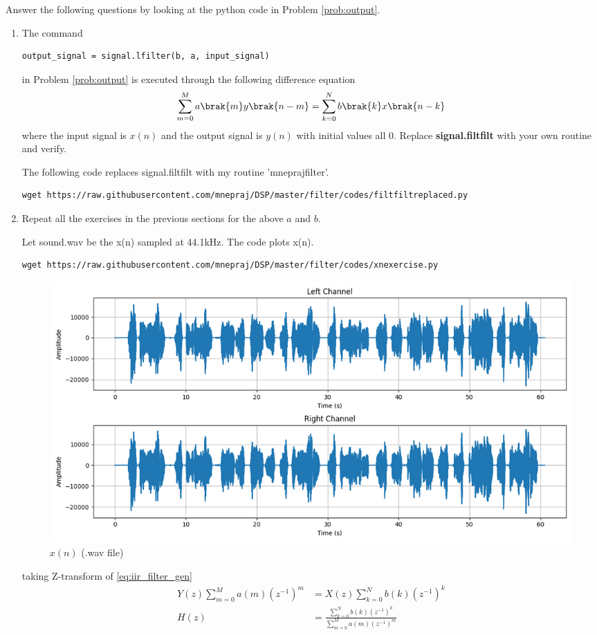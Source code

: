 \documentclass[journal, 12pt, twocolumn]{IEEEtran}
\renewcommand\thesection{\arabic{section}}
\begin{document}
Answer the following questions by looking at the python code in Problem \ref{prob:output}.
\begin{enumerate}[label=\thesection.\arabic*]
	\item
	      The command
	      \begin{lstlisting}
output_signal = signal.lfilter(b, a, input_signal)
\end{lstlisting}
	      in Problem \ref{prob:output} is executed through the following difference equation
	      \begin{equation}
		      \label{eq:iir_filter_gen}
		      \sum _{m=0}^{M}a\brak{m}y\brak{n-m}=\sum _{k=0}^{N}b\brak{k}x\brak{n-k}
	      \end{equation}
	      where the input signal is $x(n)$ and the output signal is $y(n)$ with initial values all 0. Replace
	      \textbf{signal.filtfilt} with your own routine and verify.

	      \solution
	      The following code replaces signal.filtfilt with my routine 'mneprajfilter'.
	      \begin{lstlisting}
wget https://raw.githubusercontent.com/mnepraj/DSP/master/filter/codes/filtfiltreplaced.py
\end{lstlisting}



	\item Repeat all the exercises in the previous sections for the above $a$ and $b$.

	      \solution
	      Let sound.wav be the x(n) sampled at 44.1kHz.
	      The code plots x(n).
	      \begin{lstlisting}
wget https://raw.githubusercontent.com/mnepraj/DSP/master/filter/codes/xnexercise.py
\end{lstlisting}
	      \begin{figure}[h]
		      \centering
		      \includegraphics[width=\columnwidth]{figs/xnexercise.png}
		      \caption{$x(n)$ (.wav file)}
		      \label{fig:xn_exercise}
	      \end{figure}
	      taking Z-transform of \eqref{eq:iir_filter_gen}
	      \begin{align}
		      Y(z) \sum_{m=0}^{M} a(m)(z^{-1})^m & = X(z) \sum_{k=0}^{N} b(k)(z^{-1})^k                                  \\
		      H(z)                               & = \frac{\sum_{k=0}^{N} b(k)(z^{-1})^k}{\sum_{m=0}^{M} a(m)(z^{-1})^m}
	      \end{align}


\end{enumerate}
\end{document}
